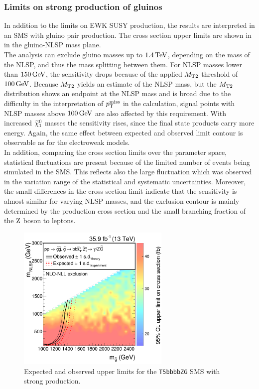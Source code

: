 \subsubsection*{Limits on strong production of gluinos}
In addition to the limits on EWK SUSY production, the results are interpreted in an SMS with gluino pair production. The cross section upper limits are shown in  in the gluino-NLSP mass plane.\\
The analysis can exclude gluino masses up to $1.4\,\text{Te\hspace{-.08em}V}$, depending on the mass of the NLSP, and thus the mass splitting between them. For NLSP masses lower than $150\,\text{Ge\hspace{-.08em}V}$, the sensitivity drops because of the applied $M_{\mathrm{T2}}$ threshold of $100\,\text{Ge\hspace{-.08em}V}$. Because $M_{\mathrm{T2}}$ yields an estimate of the NLSP mass, but the $M_{\mathrm{T2}}$ distribution shows an endpoint at the NLSP mass and is broad due to the difficulty in the interpretation of $p_{\mathrm{T}}^\text{miss}$ in the calculation, signal points with NLSP masses above $100\,\text{Ge\hspace{-.08em}V}$ are also affected by this requirement. With increased $\widetilde{\chi}^{0}_{1}$ masses the sensitivity rises, since the final state products carry more energy. Again, the same effect between expected and observed limit contour is observable as for the electroweak models.\\
In addition, comparing the cross section limits over the parameter space, statistical fluctuations are present because of the limited number of events being simulated in the SMS. This reflects also the large fluctuation which was observed in the variation range of the statistical and systematic uncertainties. Moreover, the small differences in the cross section limit indicate that the sensitivity is almost similar for varying NLSP masses, and the exclusion contour is mainly determined by the production cross section and the small branching fraction of the $\mathrm{Z}$ boson to leptons.

\begin{figure}[tbp]
 \centering
 \includegraphics[width=0.65\textwidth]{figures/EndorsementPlots/T5bbbbZg_limits_XSEC2}
 \caption{Expected and observed upper limits for the \texttt{T5bbbbZG} SMS with strong production.}
 \label{fig:limitStrong}
\end{figure}
